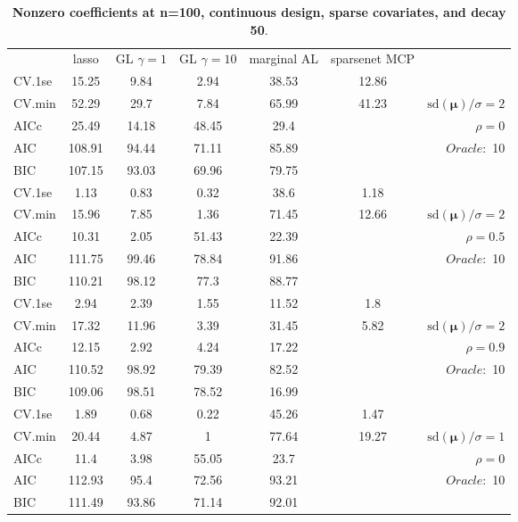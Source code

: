 \begin{table}\vspace{-.5cm}
\caption[l]{ { \bf Nonzero coefficients at n=100, continuous design, 
sparse covariates, and  decay  50}.}
\vspace{-.5cm}
\footnotesize{}
\begin{center}
\begin{tabular}{l*{5}{c}|r}
& lasso & GL $\gamma=1$ & GL $\gamma=10$ & marginal AL & sparsenet MCP  & \\
 \cline{1-7}
CV.1se & 15.25 & 9.84 & 2.94 & 38.53 & 12.86 & \\
CV.min & 52.29 & 29.7 & 7.84 & 65.99 & 41.23 &  $\mathrm{sd}(\mathbf{\mu})/\sigma=2$ \\
AICc & 25.49 & 14.18 & 48.45 & 29.4 & & $\rho=0$ \\
AIC & 108.91 & 94.44 & 71.11 & 85.89 & &  \multirow{2}{*}{$Oracle: $ 10} \\
BIC & 107.15 & 93.03 & 69.96 & 79.75 & &  \\
 \hline 
CV.1se & 1.13 & 0.83 & 0.32 & 38.6 & 1.18 & \\
CV.min & 15.96 & 7.85 & 1.36 & 71.45 & 12.66 &  $\mathrm{sd}(\mathbf{\mu})/\sigma=2$ \\
AICc & 10.31 & 2.05 & 51.43 & 22.39 & & $\rho=0.5$ \\
AIC & 111.75 & 99.46 & 78.84 & 91.86 & &  \multirow{2}{*}{$Oracle: $ 10} \\
BIC & 110.21 & 98.12 & 77.3 & 88.77 & &  \\
 \hline 
CV.1se & 2.94 & 2.39 & 1.55 & 11.52 & 1.8 & \\
CV.min & 17.32 & 11.96 & 3.39 & 31.45 & 5.82 &  $\mathrm{sd}(\mathbf{\mu})/\sigma=2$ \\
AICc & 12.15 & 2.92 & 4.24 & 17.22 & & $\rho=0.9$ \\
AIC & 110.52 & 98.92 & 79.39 & 82.52 & &  \multirow{2}{*}{$Oracle: $ 10} \\
BIC & 109.06 & 98.51 & 78.52 & 16.99 & &  \\
 \hline 
CV.1se & 1.89 & 0.68 & 0.22 & 45.26 & 1.47 & \\
CV.min & 20.44 & 4.87 & 1 & 77.64 & 19.27 &  $\mathrm{sd}(\mathbf{\mu})/\sigma=1$ \\
AICc & 11.4 & 3.98 & 55.05 & 23.7 & & $\rho=0$ \\
AIC & 112.93 & 95.4 & 72.56 & 93.21 & &  \multirow{2}{*}{$Oracle: $ 10} \\
BIC & 111.49 & 93.86 & 71.14 & 92.01 & &  \\

\end{tabular}
\end{center}
\end{table}

